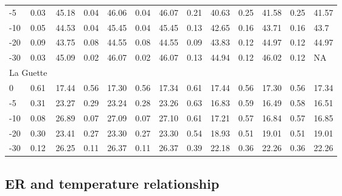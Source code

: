 \begin{table}
\begin{tabular}{lllllllllllll}
-5 & 0.03 & 45.18 & 0.04 & 46.06 & 0.04 & 46.07 & 0.21 & 40.63 & 0.25 & 41.58 & 0.25 & 41.57\\
-10 & 0.05 & 44.53 & 0.04 & 45.45 & 0.04 & 45.45 & 0.13 & 42.65 & 0.16 & 43.71 & 0.16 & 43.7\\
-20 & 0.09 & 43.75 & 0.08 & 44.55 & 0.08 & 44.55 & 0.09 & 43.83 & 0.12 & 44.97 & 0.12 & 44.97\\
-30 & 0.03 & 45.09 & 0.02 & 46.07 & 0.02 & 46.07 & 0.13 & 44.94 & 0.12 & 46.02 & 0.12 & NA\\
\multicolumn{2}{l}{La Guette} & & & & & & & & & & & \\[-.5ex]
0 & 0.61 & 17.44 & 0.56 & 17.30 & 0.56 & 17.34 & 0.61 & 17.44 & 0.56 & 17.30 & 0.56 & 17.34\\
-5 & 0.31 & 23.27 & 0.29 & 23.24 & 0.28 & 23.26 & 0.63 & 16.83 & 0.59 & 16.49 & 0.58 & 16.51\\
-10 & 0.08 & 26.89 & 0.07 & 27.09 & 0.07 & 27.10 & 0.61 & 17.21 & 0.57 & 16.84 & 0.57 & 16.85\\
-20 & 0.30 & 23.41 & 0.27 & 23.30 & 0.27 & 23.30 & 0.54 & 18.93 & 0.51 & 19.01 & 0.51 & 19.01\\
-30 & 0.12 & 26.25 & 0.11 & 26.37 & 0.11 & 26.37 & 0.39 & 22.18 & 0.36 & 22.26 & 0.36 & 22.26\\
\hline
\end{tabular} 
\hspace*{-1cm}
\label{table:mod_R2_RMSE}
\end{table}

\subsection{ER and temperature relationship}

